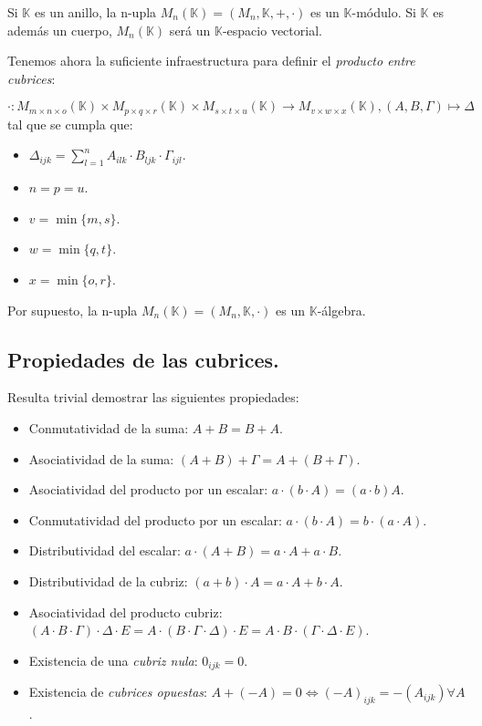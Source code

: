 Si $\mathbb{K}$ es un anillo, la n-upla $M_n (\mathbb{K}) = (M_n, \mathbb{K}, +, \cdot)$ es un $\mathbb{K}$-módulo. Si $\mathbb{K}$ es además un cuerpo, $M_n (\mathbb{K})$ será un $\mathbb{K}$-espacio vectorial.

\newpage

Tenemos ahora la suficiente infraestructura para definir el \textit{producto entre cubrices}:

$$\cdot: M_{m\times n\times o} (\mathbb{K}) \times M_{p\times q\times r} (\mathbb{K}) \times M_{s\times t\times u} (\mathbb{K}) \rightarrow M_{v\times w\times x} (\mathbb{K}), (A, B, \Gamma) \mapsto \Delta$$ tal que se cumpla que:

\begin{itemize}
	\item $\Delta_{ijk} = \sum\limits_{l=1}^{n} A_{ilk} \cdot B_{ljk} \cdot \Gamma_{ijl}$.
	\item $n = p = u$.
	\item $v = \min\{m, s\}$.
	\item $w = \min\{q, t\}$.
	\item $x = \min\{o, r\}$.
\end{itemize}

Por supuesto, la n-upla $M_n (\mathbb{K}) = (M_n, \mathbb{K}, \cdot)$ es un $\mathbb{K}$-álgebra.

\subsection{Propiedades de las cubrices.} \label{defs-properties}

Resulta trivial demostrar las siguientes propiedades:

\begin{itemize}
	\item Conmutatividad de la suma: $A + B = B + A$.
	\item Asociatividad de la suma: $(A + B) + \Gamma = A + (B + \Gamma)$.
	\item Asociatividad del producto por un escalar: $a\cdot (b\cdot A) = (a\cdot b)A$.
	\item Conmutatividad del producto por un escalar: $a\cdot (b\cdot A) = b\cdot (a\cdot A)$.
	\item Distributividad del escalar: $a\cdot (A + B) = a\cdot A + a\cdot B$.
	\item Distributividad de la cubriz: $(a + b)\cdot A = a\cdot A + b\cdot A$.
	\item Asociatividad del producto cubriz: $(A \cdot B \cdot \Gamma) \cdot \Delta \cdot E = A \cdot (B \cdot \Gamma \cdot \Delta) \cdot E = A \cdot B \cdot (\Gamma \cdot \Delta \cdot E)$.
	\item Existencia de una \textit{cubriz nula}: $0_{ijk} = 0$.
	\item Existencia de \textit{cubrices opuestas}: $A + (-A) = 0 \Leftrightarrow (-A)_{ijk} = -(A_{ijk}) \forall A$.
\end{itemize}

